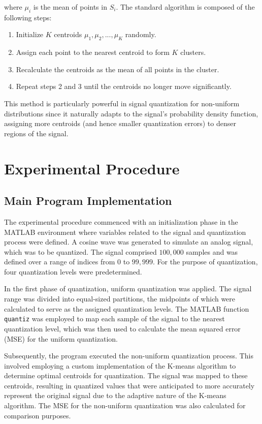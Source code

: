 \documentclass[11pt]{article}
\begin{document}
where \( \mu_i \) is the mean of points in \( S_i \). The standard algorithm is composed of the following steps:

\begin{enumerate}
\item Initialize \( K \) centroids \( \mu_1, \mu_2, ..., \mu_K \) randomly.
\item Assign each point to the nearest centroid to form \( K \) clusters.
\item Recalculate the centroids as the mean of all points in the cluster.
\item Repeat steps 2 and 3 until the centroids no longer move significantly.
\end{enumerate}

This method is particularly powerful in signal quantization for non-uniform distributions since it naturally adapts to the signal's probability density function, assigning more centroids (and hence smaller quantization errors) to denser regions of the signal.


\section{Experimental Procedure}

\subsection{Main Program Implementation}
The experimental procedure commenced with an initialization phase in the MATLAB environment where variables related to the signal and quantization process were defined. A cosine wave was generated to simulate an analog signal, which was to be quantized. The signal comprised \(100,000\) samples and was defined over a range of indices from \(0\) to \(99,999\). For the purpose of quantization, four quantization levels were predetermined.
\newline

In the first phase of quantization, uniform quantization was applied. The signal range was divided into equal-sized partitions, the midpoints of which were calculated to serve as the assigned quantization levels. The MATLAB function \texttt{quantiz} was employed to map each sample of the signal to the nearest quantization level, which was then used to calculate the mean squared error (MSE) for the uniform quantization.
\newline

Subsequently, the program executed the non-uniform quantization process. This involved employing a custom implementation of the K-means algorithm to determine optimal centroids for quantization. The signal was mapped to these centroids, resulting in quantized values that were anticipated to more accurately represent the original signal due to the adaptive nature of the K-means algorithm. The MSE for the non-uniform quantization was also calculated for comparison purposes.
\newline
\end{document}
